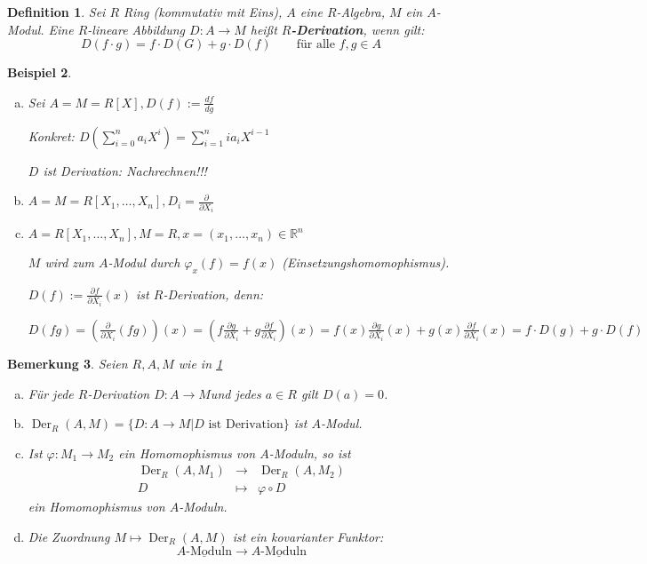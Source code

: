 \documentclass[a4paper, 12pt, numbers=noendperiod, chapterprefix=true, headsepline]{scrbook}
\theoremstyle{break}
\newtheorem{Def}{Definition}[section]
\newtheorem{Bem}[Def]{Bemerkung}
\newtheorem{Bsp}[Def]{Beispiel}
\theoremstyle{nonumberbreak}
\theoremstyle{nonumberplain}
\newcommand{\emp}[1]{\textbf{\emph{#1}}}
\newcommand{\deftermspec}[2]{{\index{#2}}\emp{#1}}
\newcommand{\Sum}{\sum\limits}
\DeclareMathOperator{\Der}{Der}
\newcommand{\R}{\mathbb{R}}
\begin{document}
\begin{Def}\label{Def17.1}
Sei $R$ Ring (kommutativ mit Eins), $A$ eine $R$-Algebra, $M$ ein $A$-Modul. Eine $R$-lineare Abbildung $D:A\to M$ hei\ss t \deftermspec{$R$-Derivation}{Derivation}, wenn gilt:
	\[ D(f\cdot g)=f\cdot D(G) + g\cdot D(f) \qquad \text{f\"ur alle }f,g \in A\]
\end{Def}

\begin{Bsp}\label{Bsp17.2}\begin{enumerate}[a)]
\item\label{Bsp17.2a}
	Sei $A=M=R[X], D(f):=\frac{df}{dg}$
	
	Konkret: $D(\Sum_{i=0}^n a_iX^i)=\Sum_{i=1}^nia_iX^{i-1}$
	
	\emph{$D$ ist Derivation:} Nachrechnen!!!
\item
	$A=M=R[X_1,\ldots ,X_n], D_i=\frac{\partial}{\partial X_i}$
\item\label{Bsp17.2c}
	$A=R[X_1,\ldots ,X_n], M=R, x=(x_1,\ldots ,x_n)\in \R^n$
	
	$M$ wird zum $A$-Modul durch $\varphi_x(f)=f(x)$ (Einsetzungshomomophismus).
	
	$D(f):=\frac{\partial f}{\partial X_i}(x)$ ist $R$-Derivation, \emph{denn:}
	
	$D(fg)=(\frac{\partial}{\partial X_i}(fg))(x)=(f\frac{\partial g}{\partial X_i}+g\frac{\partial f}{\partial X_i})(x) = f(x)\frac{\partial g}{\partial X_i}(x) + g(x)\frac{\partial f}{\partial X_i}(x) = f\cdot D(g) + g\cdot D(f)$
\end{enumerate}\end{Bsp}

\begin{Bem}\label{Bem17.3}Seien $R,A,M$ wie in \ref{Def17.1}\begin{enumerate}[a)]
\item
	F\"ur jede $R$-Derivation $D:A\to M$und jedes $a\in R$ gilt $D(a)=0$.
\item
	$\Der_R(A,M)=\{D:A\to M| D \text{ ist Derivation}\}$ ist $A$-Modul.
\item\label{Bem17.3c}
	Ist $\varphi:M_1\to M_2$ ein Homomophismus von $A$-Moduln, so ist \[\begin{array}{rcl}\Der_R(A,M_1)&\to&\Der_R(A,M_2)\\D&\mapsto&\varphi\circ D\end{array}\] ein Homomophismus von $A$-Moduln.
\item
	Die Zuordnung $M\mapsto\Der_R(A,M)$ ist ein kovarianter Funktor:
		\[ \underline{A\text{-Moduln}} \to \underline{A\text{-Moduln}} \]
\end{enumerate}\end{Bem}
\end{document}
